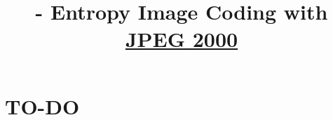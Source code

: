

\title{\SM{} - Entropy Image Coding with \href{https://en.wikipedia.org/wiki/JPEG_2000}{JPEG 2000}}

\maketitle
\tableofcontents

\section{TO-DO}
